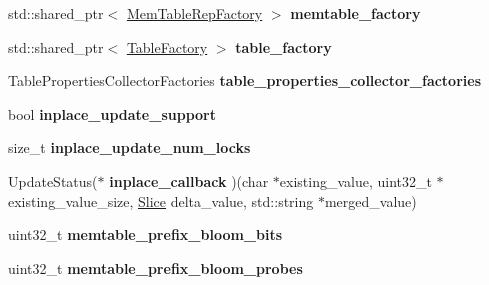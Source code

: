 \begin{DoxyCompactItemize}
\item 
std\+::shared\+\_\+ptr$<$ \hyperlink{classrocksdb_1_1MemTableRepFactory}{Mem\+Table\+Rep\+Factory} $>$ {\bfseries memtable\+\_\+factory}\hypertarget{structrocksdb_1_1ColumnFamilyOptions_a9b3cc4ef5a3a18b5ca655562c13a8124}{}\label{structrocksdb_1_1ColumnFamilyOptions_a9b3cc4ef5a3a18b5ca655562c13a8124}

\item 
std\+::shared\+\_\+ptr$<$ \hyperlink{classrocksdb_1_1TableFactory}{Table\+Factory} $>$ {\bfseries table\+\_\+factory}\hypertarget{structrocksdb_1_1ColumnFamilyOptions_a70c618eb7f362c5369e834447f8500de}{}\label{structrocksdb_1_1ColumnFamilyOptions_a70c618eb7f362c5369e834447f8500de}

\item 
Table\+Properties\+Collector\+Factories {\bfseries table\+\_\+properties\+\_\+collector\+\_\+factories}\hypertarget{structrocksdb_1_1ColumnFamilyOptions_ad4481d12bf82c5958b8095d7bd0b65e0}{}\label{structrocksdb_1_1ColumnFamilyOptions_ad4481d12bf82c5958b8095d7bd0b65e0}

\item 
bool {\bfseries inplace\+\_\+update\+\_\+support}\hypertarget{structrocksdb_1_1ColumnFamilyOptions_a9c26b13c7b636589ad7593d4b58f65ce}{}\label{structrocksdb_1_1ColumnFamilyOptions_a9c26b13c7b636589ad7593d4b58f65ce}

\item 
size\+\_\+t {\bfseries inplace\+\_\+update\+\_\+num\+\_\+locks}\hypertarget{structrocksdb_1_1ColumnFamilyOptions_a9e7478e72e22fdbaead1fea0c9baee3e}{}\label{structrocksdb_1_1ColumnFamilyOptions_a9e7478e72e22fdbaead1fea0c9baee3e}

\item 
Update\+Status($\ast$ {\bfseries inplace\+\_\+callback} )(char $\ast$existing\+\_\+value, uint32\+\_\+t $\ast$existing\+\_\+value\+\_\+size, \hyperlink{classrocksdb_1_1Slice}{Slice} delta\+\_\+value, std\+::string $\ast$merged\+\_\+value)\hypertarget{structrocksdb_1_1ColumnFamilyOptions_afdc856c10d5fc60f6bb2de0d5ebe14bf}{}\label{structrocksdb_1_1ColumnFamilyOptions_afdc856c10d5fc60f6bb2de0d5ebe14bf}

\item 
uint32\+\_\+t {\bfseries memtable\+\_\+prefix\+\_\+bloom\+\_\+bits}\hypertarget{structrocksdb_1_1ColumnFamilyOptions_a2948f1db5ec9c129c30cf53b89e6a4fb}{}\label{structrocksdb_1_1ColumnFamilyOptions_a2948f1db5ec9c129c30cf53b89e6a4fb}

\item 
uint32\+\_\+t {\bfseries memtable\+\_\+prefix\+\_\+bloom\+\_\+probes}\hypertarget{structrocksdb_1_1ColumnFamilyOptions_a2ec3c3476d17cd09df406503af29c541}{}\label{structrocksdb_1_1ColumnFamilyOptions_a2ec3c3476d17cd09df406503af29c541}


\end{DoxyCompactItemize}

